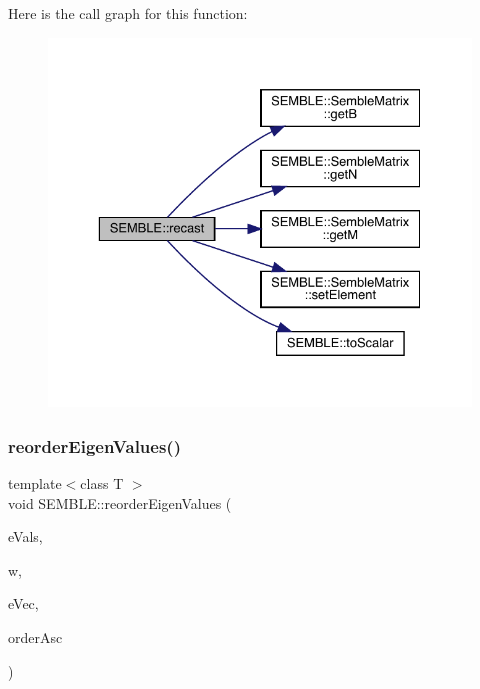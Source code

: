 Here is the call graph for this function\+:
\nopagebreak
\begin{figure}[H]
\begin{center}
\leavevmode
\includegraphics[width=329pt]{d7/dfd/namespaceSEMBLE_aadf363e3d771bf4bdedc288745a2c5a8_cgraph}
\end{center}
\end{figure}
\mbox{\label{namespaceSEMBLE_a688bf90b1c6ce1c1b6a28eb701eca973}} 
\subsubsection{\texorpdfstring{reorderEigenValues()}{reorderEigenValues()}}
{\footnotesize\ttfamily template$<$class T $>$ \\
void S\+E\+M\+B\+L\+E\+::reorder\+Eigen\+Values (\begin{DoxyParamCaption}\item[{\mbox{\hyperlink{structSEMBLE_1_1SembleVector}{Semble\+Vector}}$<$ double $>$ \&}]{e\+Vals,  }\item[{\mbox{\hyperlink{structSEMBLE_1_1SembleMatrix}{Semble\+Matrix}}$<$ T $>$ \&}]{w,  }\item[{\mbox{\hyperlink{structSEMBLE_1_1SembleMatrix}{Semble\+Matrix}}$<$ T $>$ \&}]{e\+Vec,  }\item[{bool}]{order\+Asc }\end{DoxyParamCaption})}

